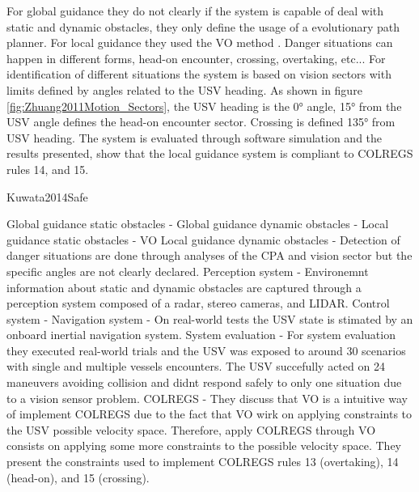 For global guidance they do not clearly if the system is capable of deal with static and dynamic obstacles, they only define the usage of a evolutionary path planner.
For local guidance they used the \ac{VO} method \cite{}.
Danger situations can happen in different forms, head-on encounter, crossing, overtaking, etc... 
For identification of different situations the system is based on vision sectors with limits defined by angles related to the \ac{USV} heading.
As shown in figure \ref{fig:Zhuang2011Motion_Sectors}, the \ac{USV} heading is the 0° angle, 15° from the \ac{USV} angle defines the head-on encounter sector.
Crossing is defined 135° from \ac{USV} heading.
The system is evaluated through software simulation and the results presented, show that the local guidance system is compliant to COLREGS rules 14, and 15.

Kuwata2014Safe

Global guidance static obstacles    -
Global guidance dynamic obstacles   -
Local guidance static obstacles     - VO
Local guidance dynamic obstacles    - Detection of danger situations are done through analyses of the \ac{CPA} and vision sector but the specific angles are not clearly declared.
Perception system                   - Environemnt information about static and dynamic obstacles are captured through a perception system composed of a radar, stereo   cameras, and \ac{LIDAR}.
Control system                      -
Navigation system                   - On real-world tests the \ac{USV} state is stimated by an onboard inertial navigation system.
System evaluation                   - For system evaluation they executed real-world trials and the \ac{USV} was exposed to around 30 scenarios with single and multiple vessels encounters. 
                                        The \ac{USV} succefully acted on 24 maneuvers avoiding collision and didnt respond safely to only one situation due to a vision sensor problem.
COLREGS                             - They discuss that \ac{VO} is a intuitive way of implement COLREGS due to the fact that \ac{VO} wirk on applying constraints to the \ac{USV} possible velocity space.
    Therefore, apply COLREGS through \ac{VO} consists on applying some more constraints to the possible velocity space.
    They present the constraints used to implement COLREGS rules 13 (overtaking), 14 (head-on), and 15 (crossing).

